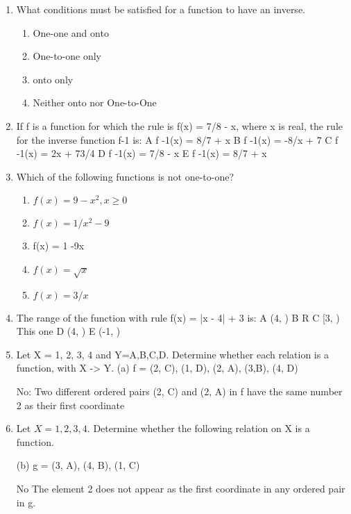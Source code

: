 
\begin{enumerate}


\item 

What conditions must be satisfied for a function to have an inverse.
\begin{enumerate}
\item One-one and onto
\item One-to-one only
\item onto only
\item Neither onto nor One-to-One
\end{enumerate}
\item 

If f is a function for which the rule is f(x) = 7/8  - x, where x is real, the rule for the inverse function f-1 is:
A	f -1(x) = 8/7 + x
B	f -1(x) = -8/x + 7 
C	f -1(x) = 2x + 73/4 
D	f -1(x) = 7/8 - x  %
E	f -1(x) = 8/7 + x

\item 
Which of the following functions is not one-to-one?
\begin{enumerate}
\item 	$f(x) = 9 - x^2, x \geq 0$
\item 	$f(x) = 1/x^2  - 9$ %
\item	f(x) = 1 -9x
\item	$f(x) = \sqrt{x}$
\item	$f(x) = 3/x $
\end{enumerate}
\item 
The range of the function with rule f(x) = |x - 4| + 3 is:
A	(4, \infty)
B	R
C	[3, \infty) This one
D	(4, \infty)
E	(-1, \infty)

\item Let X = {1, 2, 3, 4} and Y={A,B,C,D}. Determine whether each relation is a function, with X -> Y.
(a) f = {(2, C), (1, D), (2, A), (3,B), (4, D)}

No:  Two different ordered pairs (2, C) and (2, A) in f have the same number 2 as their first coordinate

\item Let $X = {1, 2, 3, 4}$. Determine whether the following relation on X is a function.

(b) g = {(3, A), (4, B), (1, C)}

No The element 2 does not appear as the first coordinate in any ordered pair in g.
\end{enumerate}


